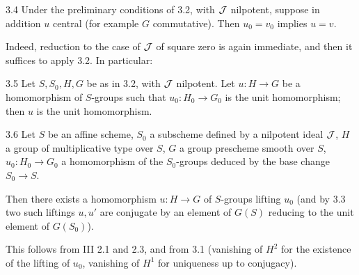 \begin{corollary}{3.4}\label{IX.3.4}
Under the preliminary conditions of 3.2, with $\cal J$ nilpotent, suppose in addition $u$ central (for example $G$ commutative). Then $u_0=v_0$ implies $u=v$.
\end{corollary}
Indeed, reduction to the case of $\cal J$ of square zero is again immediate, and then it suffices to apply 3.2. In particular:
\begin{corollary}{3.5}\label{IX.3.5}
Let $S,S_0,H,G$ be as in 3.2, with $\cal J$ nilpotent. Let $u:H\to G$ be a homomorphism of $S$-groups such that $u_0:H_0\to G_0$ is the unit homomorphism; then $u$ is the unit homomorphism.
\end{corollary}
\begin{theorem}{3.6}\label{IX.3.6}
Let $S$ be an affine scheme, $S_0$ a subscheme defined by a nilpotent ideal $\cal J$, $H$ a group of multiplicative type over $S$, $G$ a group prescheme smooth over $S$, $u_0:H_0\to G_0$ a homomorphism of the $S_0$-groups deduced by the base change $S_0\to S$.

Then there exists a homomorphism $u:H\to G$ of $S$-groups lifting $u_0$ (and by 3.3 two such liftings $u,u'$ are conjugate by an element of $G(S)$ reducing to the unit element of $G(S_0)$).
\end{theorem}
This follows from III 2.1 and 2.3, and from 3.1 (vanishing of $H^2$ for the existence of the lifting of $u_0$, vanishing of $H^1$ for uniqueness up to conjugacy).

